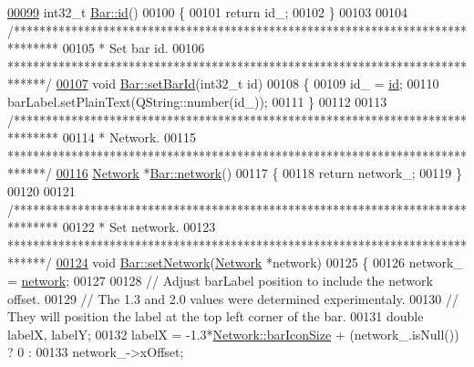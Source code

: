 \begin{DoxyCode}
\hypertarget{bar_8cpp_source_l00099}{}\hyperlink{group___models_gacf0fb781a73856bb7beb823304465e13}{00099} int32\_t \hyperlink{group___models_gacf0fb781a73856bb7beb823304465e13}{Bar::id}()
00100 \{
00101   \textcolor{keywordflow}{return} id\_;
00102 \}
00103 
00104 \textcolor{comment}{/*******************************************************************************}
00105 \textcolor{comment}{ * Set bar id.}
00106 \textcolor{comment}{ ******************************************************************************/}
\hypertarget{bar_8cpp_source_l00107}{}\hyperlink{group___models_gae3cf341a76cc4589fe3203d0a3ed2ac0}{00107} \textcolor{keywordtype}{void} \hyperlink{group___models_gae3cf341a76cc4589fe3203d0a3ed2ac0}{Bar::setBarId}(int32\_t \textcolor{keywordtype}{id})
00108 \{
00109   id\_ = \hyperlink{group___models_gacf0fb781a73856bb7beb823304465e13}{id};
00110   barLabel.setPlainText(QString::number(id\_));
00111 \}
00112 
00113 \textcolor{comment}{/*******************************************************************************}
00114 \textcolor{comment}{ * Network.}
00115 \textcolor{comment}{ ******************************************************************************/}
\hypertarget{bar_8cpp_source_l00116}{}\hyperlink{group___models_gab0594d5d7313e8749bb85434b255db9a}{00116} \hyperlink{class_network}{Network} *\hyperlink{group___models_gab0594d5d7313e8749bb85434b255db9a}{Bar::network}()
00117 \{
00118   \textcolor{keywordflow}{return} network\_;
00119 \}
00120 
00121 \textcolor{comment}{/*******************************************************************************}
00122 \textcolor{comment}{ * Set network.}
00123 \textcolor{comment}{ ******************************************************************************/}
\hypertarget{bar_8cpp_source_l00124}{}\hyperlink{group___models_gade9a307fdb6a81871787899ec1af5833}{00124} \textcolor{keywordtype}{void} \hyperlink{group___models_gade9a307fdb6a81871787899ec1af5833}{Bar::setNetwork}(\hyperlink{class_network}{Network} *network)
00125 \{
00126   network\_ = \hyperlink{group___models_gab0594d5d7313e8749bb85434b255db9a}{network};
00127 
00128   \textcolor{comment}{// Adjust barLabel position to include the network offset.}
00129   \textcolor{comment}{// The 1.3 and 2.0 values were determined experimentaly.}
00130   \textcolor{comment}{// They will position the label at the top left corner of the bar.}
00131   \textcolor{keywordtype}{double} labelX, labelY;
00132   labelX = -1.3*\hyperlink{group___models_gaa334bbc93b3fde219840e95e23198b53}{Network::barIconSize} + (network\_.isNull()) ? 0 :
00133            network\_->xOffset;

\end{DoxyCode}
